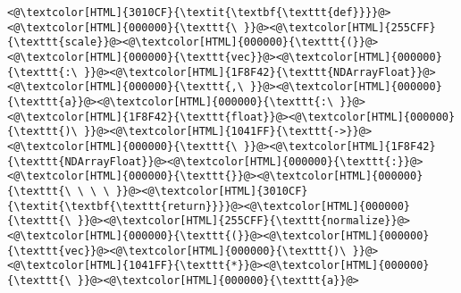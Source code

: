 \begin{lstlisting}
<@\textcolor[HTML]{3010CF}{\textit{\textbf{\texttt{def}}}}@><@\textcolor[HTML]{000000}{\texttt{\ }}@><@\textcolor[HTML]{255CFF}{\texttt{scale}}@><@\textcolor[HTML]{000000}{\texttt{(}}@><@\textcolor[HTML]{000000}{\texttt{vec}}@><@\textcolor[HTML]{000000}{\texttt{:\ }}@><@\textcolor[HTML]{1F8F42}{\texttt{NDArrayFloat}}@><@\textcolor[HTML]{000000}{\texttt{,\ }}@><@\textcolor[HTML]{000000}{\texttt{a}}@><@\textcolor[HTML]{000000}{\texttt{:\ }}@><@\textcolor[HTML]{1F8F42}{\texttt{float}}@><@\textcolor[HTML]{000000}{\texttt{)\ }}@><@\textcolor[HTML]{1041FF}{\texttt{->}}@><@\textcolor[HTML]{000000}{\texttt{\ }}@><@\textcolor[HTML]{1F8F42}{\texttt{NDArrayFloat}}@><@\textcolor[HTML]{000000}{\texttt{:}}@>
<@\textcolor[HTML]{000000}{\texttt{}}@><@\textcolor[HTML]{000000}{\texttt{\ \ \ \ }}@><@\textcolor[HTML]{3010CF}{\textit{\textbf{\texttt{return}}}}@><@\textcolor[HTML]{000000}{\texttt{\ }}@><@\textcolor[HTML]{255CFF}{\texttt{normalize}}@><@\textcolor[HTML]{000000}{\texttt{(}}@><@\textcolor[HTML]{000000}{\texttt{vec}}@><@\textcolor[HTML]{000000}{\texttt{)\ }}@><@\textcolor[HTML]{1041FF}{\texttt{*}}@><@\textcolor[HTML]{000000}{\texttt{\ }}@><@\textcolor[HTML]{000000}{\texttt{a}}@>

\end{lstlisting}
